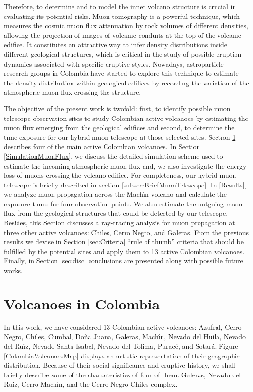 \documentclass[letterpaper,10pt,titlepage,linenumber]{article}
\begin{document}
Therefore, to determine and to model the inner volcano structure is crucial in evaluating its potential risks. Muon tomography is a powerful technique, which measures the cosmic muon flux attenuation by rock volumes of different densities, allowing the projection of images of volcanic conduits at the top of the volcanic edifice. It constitutes an attractive way to infer density distributions inside different geological structures, which is critical in the study of possible eruption dynamics associated with specific eruptive styles. Nowadays, astroparticle research groups in Colombia have started to explore this technique to estimate the density distribution within geological edifices by recording the variation of the atmospheric muon flux crossing the structure\cite{TapiaEtal2016,SierraPortaEtal2018, PenarodriguezEtal2018B, PenarodriguezEtal2019, GuerreroEtal2019, TorresEtal2019, ParraAvila2019}. 

The objective of the present work is twofold: first, to identify possible muon telescope observation sites to study Colombian active volcanoes by estimating the muon flux emerging from the geological edifices and second, to determine the time exposure for our hybrid muon telescope at those selected sites. Section \ref{ColombiaVolcanoes} describes four of the main active Colombian volcanoes. In Section \ref{SimulationMuonFlux}, we discuss the detailed simulation scheme used to estimate the incoming atmospheric muon flux and, we also investigate the energy loss of muons crossing the volcano edifice. For completeness, our hybrid muon telescope is briefly described in section \ref{subsec:BriefMuonTelescope}. In  \ref{Results}, we analyze muon propagation across the Mach\'{\i}n volcano and calculate the exposure times for four observation points. We also estimate the outgoing muon flux from the geological structures that could be detected by our telescope. Besides, this Section discusses a ray-tracing analysis for muon propagation at three other active volcanoes: Chiles, Cerro Negro, and Galeras. From the previous results we devise in Section \ref{sec:Criteria} ``rule of thumb'' criteria that should be fulfilled by the potential sites and apply them to 13 active Colombian volcanoes.  Finally, in Section \ref{sec:disc} conclusions are presented along with possible future works.

\section{Volcanoes in Colombia}
\label{ColombiaVolcanoes}
In this work, we have considered 13 Colombian active volcanoes: Azufral, Cerro Negro, Chiles, Cumbal, Do\~na Juana, Galeras, Mach\'{\i}n,  Nevado del Huila,  Nevado del Ru\'{\i}z,  Nevado Santa Isabel,  Nevado del Tolima,  Purac\'e, and Sotar\'a. Figure \ref{ColombiaVolcanoesMap} displays an artistic representation of their geographic distribution. Because of their social significance and eruptive history, we shall briefly describe some of the characteristics of four of them: Galeras, Nevado del Ruiz, Cerro Mach\'{\i}n, and the Cerro Negro-Chiles complex.
\end{document}
